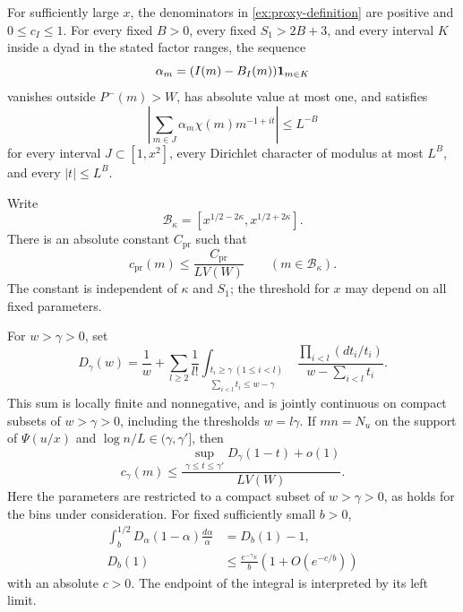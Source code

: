 \begin{lemma}\label{ex:proxies}
For sufficiently large $x$, the denominators in
\eqref{ex:proxy-definition} are positive and $0\le c_I\le1$.
For every fixed $B>0$, every fixed $S_1>2B+3$, and every interval
$K$ inside a dyad in the stated factor ranges, the sequence
\[
 \alpha_m=(I(m)-B_I(m))\mathbf{1}_{m\in K}
\]
vanishes outside $P^-(m)>W$, has absolute value at most one, and
satisfies
\begin{equation}\label{ex:proxy-discrepancy}
 \left|\sum_{m\in J}\alpha_m\chi(m)m^{-1+it}\right|\le L^{-B}
\end{equation}
for every interval $J\subset[1,x^2]$, every Dirichlet character
of modulus at most $L^B$, and every $|t|\le L^B$.

Write
\[
 \mathcal B_\kappa=[x^{1/2-2\kappa},x^{1/2+2\kappa}].
\]
There is an absolute constant $C_{\mathrm{pr}}$ such that
\begin{equation}\label{ex:prime-density}
 c_{\mathrm{pr}}(m)\le\frac{C_{\mathrm{pr}}}{LV(W)}
       \qquad(m\in\mathcal B_\kappa).
\end{equation}
The constant is independent of $\kappa$ and $S_1$; the threshold
for $x$ may depend on all fixed parameters.

For $w>\gamma>0$, set
\begin{equation}\label{ex:rough-density}
 D_\gamma(w)=\frac1w+
 \sum_{l\ge2}\frac1{l!}
 \int_{\substack{t_i\ge\gamma\ (1\le i<l)\\
                   \sum_{i<l}t_i\le w-\gamma}}
       \frac{\prod_{i<l}(dt_i/t_i)}{w-\sum_{i<l}t_i}.
\end{equation}
This sum is locally finite and nonnegative, and is jointly
continuous on compact subsets of $w>\gamma>0$, including the
thresholds $w=l\gamma$. If $mn=N_u$ on the support of $\Psi(u/x)$
and $\log n/L\in(\gamma,\gamma']$, then
\begin{equation}\label{ex:rough-proxy-bound}
 c_\gamma(m)\le
 \frac{\sup_{\gamma\le t\le\gamma'}D_\gamma(1-t)+o(1)}{LV(W)}.
\end{equation}
Here the parameters are restricted to a compact subset of
$w>\gamma>0$, as holds for the bins under consideration. For fixed
sufficiently small $b>0$,
\begin{align}
 \int_b^{1/2}D_\alpha(1-\alpha)\frac{d\alpha}{\alpha}
     &=D_b(1)-1,\label{ex:density-integral}\\
 D_b(1)&\le\frac{e^{-\gamma_E}}b(1+O(e^{-c/b}))
       \label{ex:density-upper}
\end{align}
with an absolute $c>0$. The endpoint of the integral is interpreted
by its left limit.
\end{lemma}

